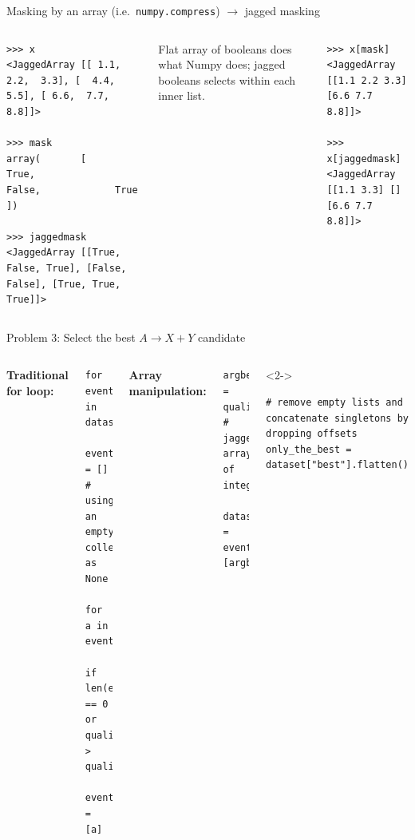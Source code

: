 \documentclass[aspectratio=169]{beamer}
\begin{document}
\begin{frame}[fragile]{Masking by an array (i.e.\ \texttt{numpy.compress}) $\to$ jagged masking}
\small
\begin{columns}
\begin{verbatim}
>>> x
<JaggedArray [[ 1.1,   2.2,  3.3], [  4.4,   5.5], [ 6.6,  7.7,  8.8]]>

>>> mask
array(       [        True,             False,             True      ])

>>> jaggedmask
<JaggedArray [[True, False, True], [False, False], [True, True, True]]>
\end{verbatim}

\vspace{0.5 cm}
\normalsize
Flat array of booleans does what Numpy does; jagged booleans selects within each inner list.

\small
\begin{verbatim}
>>> x[mask]
<JaggedArray [[1.1 2.2 3.3] [6.6 7.7 8.8]]>

>>> x[jaggedmask]
<JaggedArray [[1.1 3.3] [] [6.6 7.7 8.8]]>
\end{verbatim}
\end{columns}
\end{frame}

\begin{frame}[fragile]{Problem 3: Select the best $A \to X + Y$ candidate}
\vspace{0.5 cm}
\begin{columns}
{\bf Traditional for loop:} 
\small
\begin{verbatim}
for event in dataset:
    event.best = []              # using an empty collection as None
    for a in event.A:
        if len(event.best) == 0 or quality(a) > quality(event.best[0]):
            event.best = [a]
\end{verbatim}
\normalsize

\vspace{0.5 cm}
{\bf Array manipulation:} 
\small
\begin{verbatim}
argbest = quality(events["A"]).argmax()   # jagged array of integers

dataset["best"] = events["A"][argbest]
\end{verbatim}

\vspace{0.05 cm}
\begin{uncoverenv}<2->
\begin{verbatim}
# remove empty lists and concatenate singletons by dropping offsets
only_the_best = dataset["best"].flatten()
\end{verbatim}
\end{uncoverenv}
\end{columns}
\end{frame}
\end{document}
